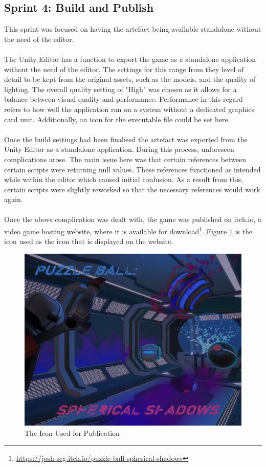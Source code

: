 \subsection{Sprint 4: Build and Publish}
This sprint was focused on having the artefact being available standalone without the need of the editor.
\\\\
The Unity Editor has a function to export the game as a standalone application without the need of the editor. The settings for this range from they level of detail to be kept from the original assets, such as the models, and the quality of lighting. The overall quality setting of "High" was chosen as it allows for a balance between visual quality and performance. Performance in this regard refers to how well the application ran on a system without a dedicated graphics card unit. Additionally, an icon for the executable file could be set here.
\\\\
Once the build settings had been finalised the artefact was exported from the Unity Editor as a standalone application. During this process, unforeseen complications arose. The main issue here was that certain references between certain scripts were returning null values. These references functioned as intended while within the editor which caused initial confusion. As a result from this, certain scripts were slightly reworked so that the necessary references would work again. 
\\\\
Once the above complication was dealt with, the game was published on itch.io, a video game hosting website, where it is available for download\footnote{\url{https://josh-scg.itch.io/puzzle-ball-spherical-shadows}}. Figure \ref{thumb} is the icon used as the icon that is displayed on the website. 


\begin{figure}[H]
\centering
\includegraphics[scale=0.6]{Figures/thumb.png}
\caption{The Icon Used for Publication}
\label{thumb}
\end{figure}

